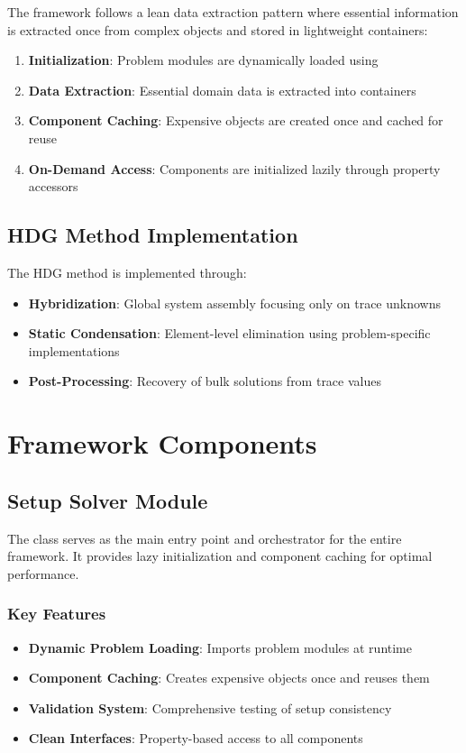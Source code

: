 The framework follows a lean data extraction pattern where essential information is extracted once from complex objects and stored in lightweight containers:

\begin{enumerate}
    \item \textbf{Initialization}: Problem modules are dynamically loaded using 
    \item \textbf{Data Extraction}: Essential domain data is extracted into  containers
    \item \textbf{Component Caching}: Expensive objects are created once and cached for reuse
    \item \textbf{On-Demand Access}: Components are initialized lazily through property accessors
\end{enumerate}

\subsection{HDG Method Implementation}

The HDG method is implemented through:

\begin{itemize}
    \item \textbf{Hybridization}: Global system assembly focusing only on trace unknowns
    \item \textbf{Static Condensation}: Element-level elimination using problem-specific implementations
    \item \textbf{Post-Processing}: Recovery of bulk solutions from trace values
\end{itemize}

\section{Framework Components}
\label{sec:framework_components}

\subsection{Setup Solver Module}

The  class serves as the main entry point and orchestrator for the entire framework. It provides lazy initialization and component caching for optimal performance.

\subsubsection{Key Features}
\begin{itemize}
    \item \textbf{Dynamic Problem Loading}: Imports problem modules at runtime
    \item \textbf{Component Caching}: Creates expensive objects once and reuses them
    \item \textbf{Validation System}: Comprehensive testing of setup consistency
    \item \textbf{Clean Interfaces}: Property-based access to all components
\end{itemize}

